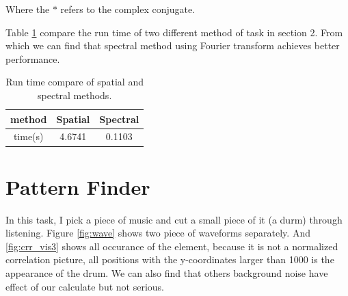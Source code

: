 Where the $*$ refers to the complex conjugate.

Table \ref{tab:run_time} compare the run time of two different method of task in section 2. From which we can find that spectral method using Fourier transform achieves better performance.

\begin{table}[h!]
	\centering
	\begin{tabular}{c|c|c}
		\hline
		method & Spatial  & Spectral \\
		\hline
		time(s) & 4.6741 & 0.1103 \\
		\hline
	\end{tabular}
	\caption{Run time compare of spatial and spectral methods.}
	\label{tab:run_time}
\end{table}

\section{Pattern Finder}

In this task, I pick a piece of music and cut a small piece of it (a durm) through listening. Figure \ref{fig:wave} shows two piece of  waveforms separately. And 
\ref{fig:crr_vis3} shows all occurance of the element, because it is not a normalized correlation picture, all positions with the y-coordinates larger than 1000 is the appearance of the drum. We can also find that others background noise have effect of our calculate but not serious.

